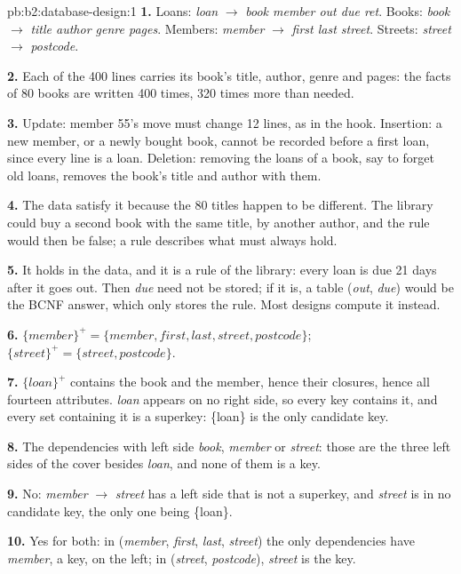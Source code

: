 \begin{solution}{pb:b2:database-design:1}
\textbf{1.} Loans: \emph{loan} $\to$ \emph{book member out due ret}. Books: \emph{book} $\to$ \emph{title author genre
pages}. Members: \emph{member} $\to$ \emph{first last street}. Streets: \emph{street} $\to$ \emph{postcode}.

\textbf{2.} Each of the 400 lines carries its book's title, author, genre and pages: the facts of 80 books are written
400 times, 320 times more than needed.

\textbf{3.} Update: member 55's move must change 12 lines, as in the hook. Insertion: a new member, or a newly bought
book, cannot be recorded before a first loan, since every line is a loan. Deletion: removing the loans of a book, say to
forget old loans, removes the book's title and author with them.

\textbf{4.} The data satisfy it because the 80 titles happen to be different. The library could buy a second book with
the same title, by another author, and the rule would then be false; a rule describes what must always hold.

\textbf{5.} It holds in the data, and it is a rule of the library: every loan is due 21 days after it goes out. Then
\emph{due} need not be stored; if it is, a table (\emph{out}, \emph{due}) would be the BCNF answer, which only stores the
rule. Most designs compute it instead.

\textbf{6.} $\{\mathit{member}\}^+ = \{\mathit{member}, \mathit{first}, \mathit{last}, \mathit{street}, \mathit{postcode}\}$;
$\{\mathit{street}\}^+ = \{\mathit{street}, \mathit{postcode}\}$.

\textbf{7.} $\{\mathit{loan}\}^+$ contains the book and the member, hence their closures, hence all fourteen attributes.
\emph{loan} appears on no right side, so every key contains it, and every set containing it is a superkey: \{loan\} is the
only candidate key.

\textbf{8.} The dependencies with left side \emph{book}, \emph{member} or \emph{street}: those are the three left sides of
the cover besides \emph{loan}, and none of them is a key.

\textbf{9.} No: \emph{member} $\to$ \emph{street} has a left side that is not a superkey, and \emph{street} is in no
candidate key, the only one being \{loan\}.

\textbf{10.} Yes for both: in (\emph{member}, \emph{first}, \emph{last}, \emph{street}) the only  dependencies
have \emph{member}, a key, on the left; in (\emph{street}, \emph{postcode}), \emph{street} is the key.


\end{solution}
